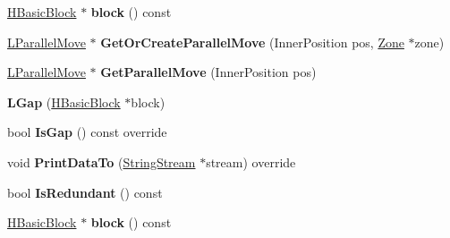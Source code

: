 \begin{DoxyCompactItemize}
\item 
\hyperlink{classv8_1_1internal_1_1_h_basic_block}{H\+Basic\+Block} $\ast$ {\bfseries block} () const \hypertarget{classv8_1_1internal_1_1_l_gap_a14ee6777d69e95f0c17ce3dcc0c6431e}{}\label{classv8_1_1internal_1_1_l_gap_a14ee6777d69e95f0c17ce3dcc0c6431e}

\item 
\hyperlink{classv8_1_1internal_1_1_l_parallel_move}{L\+Parallel\+Move} $\ast$ {\bfseries Get\+Or\+Create\+Parallel\+Move} (Inner\+Position pos, \hyperlink{classv8_1_1internal_1_1_zone}{Zone} $\ast$zone)\hypertarget{classv8_1_1internal_1_1_l_gap_afa07f91a1bdbab70770e57c45a4c93cd}{}\label{classv8_1_1internal_1_1_l_gap_afa07f91a1bdbab70770e57c45a4c93cd}

\item 
\hyperlink{classv8_1_1internal_1_1_l_parallel_move}{L\+Parallel\+Move} $\ast$ {\bfseries Get\+Parallel\+Move} (Inner\+Position pos)\hypertarget{classv8_1_1internal_1_1_l_gap_a80a7bd7cd4beef3be42928544646c5fb}{}\label{classv8_1_1internal_1_1_l_gap_a80a7bd7cd4beef3be42928544646c5fb}

\item 
{\bfseries L\+Gap} (\hyperlink{classv8_1_1internal_1_1_h_basic_block}{H\+Basic\+Block} $\ast$block)\hypertarget{classv8_1_1internal_1_1_l_gap_a065fcd3080fabb91cccfc541f7cf90f0}{}\label{classv8_1_1internal_1_1_l_gap_a065fcd3080fabb91cccfc541f7cf90f0}

\item 
bool {\bfseries Is\+Gap} () const  override\hypertarget{classv8_1_1internal_1_1_l_gap_aac0749ec3212db7ad37d7fcb6a7a31fd}{}\label{classv8_1_1internal_1_1_l_gap_aac0749ec3212db7ad37d7fcb6a7a31fd}

\item 
void {\bfseries Print\+Data\+To} (\hyperlink{classv8_1_1internal_1_1_string_stream}{String\+Stream} $\ast$stream) override\hypertarget{classv8_1_1internal_1_1_l_gap_ad22b85643ee0ccf9a50f8cc0e73abc19}{}\label{classv8_1_1internal_1_1_l_gap_ad22b85643ee0ccf9a50f8cc0e73abc19}

\item 
bool {\bfseries Is\+Redundant} () const \hypertarget{classv8_1_1internal_1_1_l_gap_afd74524d060224489b5e7095e3354e1e}{}\label{classv8_1_1internal_1_1_l_gap_afd74524d060224489b5e7095e3354e1e}

\item 
\hyperlink{classv8_1_1internal_1_1_h_basic_block}{H\+Basic\+Block} $\ast$ {\bfseries block} () const \hypertarget{classv8_1_1internal_1_1_l_gap_a14ee6777d69e95f0c17ce3dcc0c6431e}{}\label{classv8_1_1internal_1_1_l_gap_a14ee6777d69e95f0c17ce3dcc0c6431e}


\end{DoxyCompactItemize}
